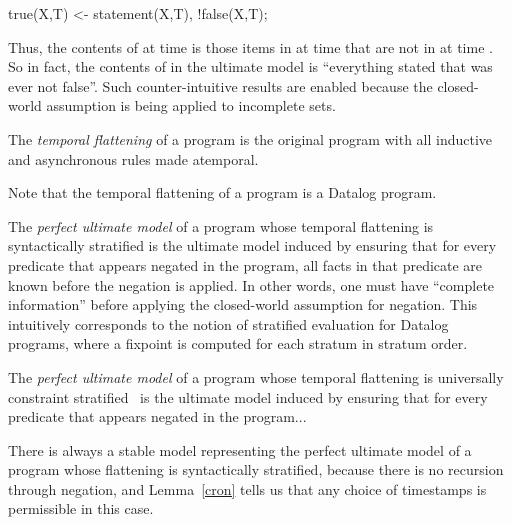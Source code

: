\begin{Dedalus}
true(X,T) <- statement(X,T), !false(X,T);
\end{Dedalus}

Thus, the contents of  at time  is those items in  at time  that are not in  at time .  So in fact, the contents of  in the ultimate model is ``everything stated that was ever not false''.  Such counter-intuitive results are enabled because the closed-world assumption is being applied to incomplete sets.

\begin{definition}
The {\em temporal flattening} of a \lang program is the original program with all inductive and asynchronous rules made atemporal.
\end{definition}

Note that the temporal flattening of a \lang program is a Datalog program.

\begin{definition}
The {\em perfect ultimate model} of a \lang program whose temporal flattening is syntactically stratified is the ultimate model induced by ensuring that for every predicate that appears negated in the program, all facts in that predicate are known before the negation is applied.  In other words, one must have ``complete information'' before applying the closed-world assumption for negation.  This intuitively corresponds to the notion of stratified evaluation for Datalog programs, where a fixpoint is computed for each stratum in stratum order.
\end{definition}

\begin{definition}
The {\em perfect ultimate model} of a \lang program whose temporal flattening is universally constraint stratified~\cite{ross-ucs} is the ultimate model induced by ensuring that for every predicate that appears negated in the program... 
\end{definition}

There is always a stable model representing the perfect ultimate model of a \lang program whose flattening is syntactically stratified, because there is no recursion through negation, and Lemma~\ref{cron} tells us that any choice of timestamps is permissible in this case.

